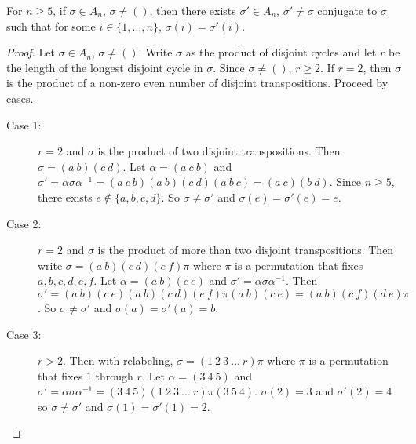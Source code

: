 \documentclass[a4paper]{article}
\begin{document}
\begin{lemma}
\label{fixedpointlemma}
For $n \ge 5$, if $\sigma \in A_n$, $\sigma \ne ()$, then there exists $\sigma' \in A_n$, $\sigma' \ne \sigma$ conjugate to $\sigma$ such that for some $i \in \{1, ..., n\}$, $\sigma(i) = \sigma'(i)$.
\end{lemma}
\begin{proof}
Let $\sigma \in A_n$, $\sigma \ne ()$. Write $\sigma$ as the product of disjoint cycles and let $r$ be the length of the longest disjoint cycle in $\sigma$. Since $\sigma \ne ()$, $r \ge 2$. If $r = 2$, then $\sigma$ is the product of a non-zero even number of disjoint transpositions. Proceed by cases.
\begin{description}
	\item[Case 1:]$r = 2$ and $\sigma$ is the product of two disjoint transpositions.
	Then $\sigma = (a\ b)(c\ d)$. Let $\alpha = (a\ c\ b)$ and $\sigma' = \alpha \sigma \alpha^{-1} = (a\ c\ b)(a\ b)(c\ d)(a\ b\ c) = (a\ c)(b\ d)$. Since $n \ge 5$, there exists $e \notin \{a, b, c, d\}$. So $\sigma \ne \sigma'$ and $\sigma(e) = \sigma'(e) = e$.
	\item[Case 2:]$r = 2$ and $\sigma$ is the product of more than two disjoint transpositions.
	Then write $\sigma = (a\ b)(c\ d)(e\ f)\pi$ where $\pi$ is a permutation that fixes $a, b, c, d, e, f$. Let $\alpha = (a\ b)(c\ e)$ and $\sigma' = \alpha \sigma \alpha^{-1}$. Then $\sigma' = (a\ b)(c\ e)(a\ b)(c\ d)(e\ f)\pi(a\ b)(c\ e) = (a\ b)(c\ f)(d\ e)\pi$. So $\sigma \ne \sigma'$ and $\sigma(a) = \sigma'(a) = b$.
	\item[Case 3:]$r > 2$.
	Then with relabeling, $\sigma = (1\ 2\ 3\ ...\ r)\pi$ where $\pi$ is a permutation that fixes $1$ through $r$. Let $\alpha = (3\ 4\ 5)$ and $\sigma' = \alpha \sigma \alpha^{-1} = (3\ 4\ 5)(1\ 2\ 3\ ...\ r)\pi(3\ 5\ 4)$. $\sigma(2) = 3$ and $\sigma'(2) = 4$ so $\sigma \ne \sigma'$ and $\sigma(1) = \sigma'(1) = 2$.
\end{description}
\end{proof}
\end{document}

